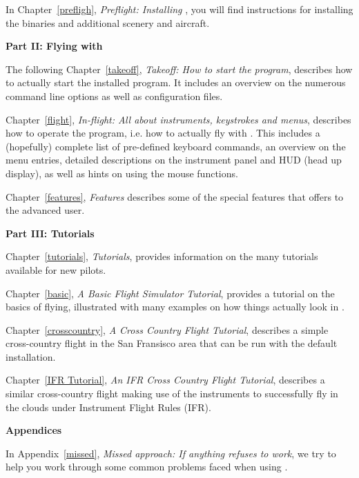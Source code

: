  \noindent
In Chapter~\ref{prefligh}, \textit{Preflight: Installing \FlightGear{}}, you will find
instructions for installing the binaries and additional scenery and aircraft.
 \medskip

\noindent
\textbf{Part II: Flying with \FlightGear{}}
\medskip

 \noindent
  The following Chapter~\ref{takeoff}, \textit{Takeoff: How to start
  the program}, describes how to actually start the installed program.
  It includes an overview on the numerous command line options as well
  as configuration files.
 \medskip

 \noindent
  Chapter~\ref{flight}, \textit{In-flight: All about instruments,
  keystrokes and menus}, describes how to operate the program, i.e.
  how to actually fly with \FlightGear{}\hspace{-1mm}. This includes a
  (hopefully) complete list of pre-defined keyboard commands, an
  overview on the menu entries, detailed descriptions on the instrument
  panel and HUD (head up display), as well as hints on using the mouse
  functions.
 \medskip

 \noindent
  Chapter~\ref{features}, \textit{Features} describes some of the special
  features that \FlightGear{} offers to the advanced user.
 \medskip

\noindent
\textbf{Part III: Tutorials}
\medskip

 \noindent
 Chapter~\ref{tutorials}, \textit{Tutorials},
provides information on the many tutorials available for new pilots.
 \medskip

 \noindent
 Chapter~\ref{basic}, \textit{A Basic Flight Simulator Tutorial},
provides a tutorial on the basics of flying, illustrated with many
examples on how things actually look in \FlightGear{}.
 \medskip

 \noindent
 Chapter~\ref{crosscountry}, \textit{A Cross Country Flight Tutorial},
describes a simple cross-country flight in the San Fransisco area that
can be run with the default installation.
 \medskip

 \noindent
 Chapter~\ref{IFR Tutorial}, \textit{An IFR Cross Country Flight Tutorial},
describes a similar cross-country flight making use of the instruments to
successfully fly in the clouds under Instrument Flight Rules (IFR).
 \medskip

\noindent
\textbf{Appendices}
\medskip

 \noindent
  In Appendix~\ref{missed}, \textit{Missed approach: If anything refuses to work},
   we try to help you work through some common problems faced when using \FlightGear{}.
 \medskip


